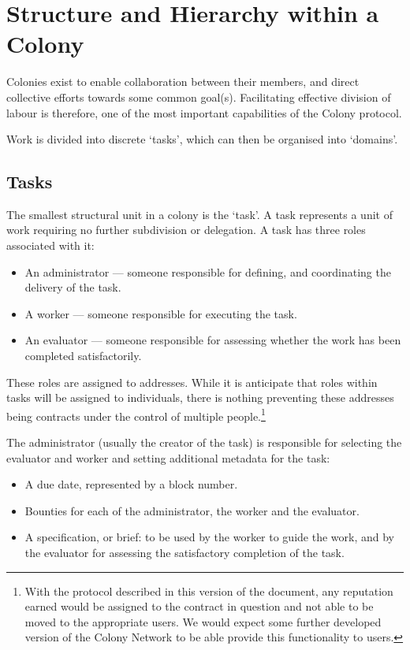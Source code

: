 \section{Structure and Hierarchy within a Colony}\label{sec:colony-structure}
Colonies exist to enable collaboration between their members, and direct collective efforts towards some common goal(s). Facilitating effective division of labour is therefore, one of the most important capabilities of the Colony protocol.

Work is divided into discrete `tasks', which can then be organised into `domains'.

\subsection{Tasks}\label{sec:tasks}

The smallest structural unit in a colony is the `task'. A task represents a unit of work requiring no further subdivision or delegation. A task has three roles associated with it:
\begin{itemize}
\item An administrator --- someone responsible for defining, and coordinating the delivery of the task.
\item A worker --- someone responsible for executing the task.
\item An evaluator --- someone responsible for assessing whether the work has been completed satisfactorily.
\end{itemize}

These roles are assigned to addresses. While it is anticipate that roles within tasks will be assigned to individuals, there is nothing preventing these addresses being contracts under the control of multiple people.\footnote{With the protocol described in this version of the document, any reputation earned would be assigned to the contract in question and not able to be moved to the appropriate users. We would expect some further developed version of the Colony Network to be able provide this functionality to users.}

The administrator (usually the creator of the task) is responsible for selecting the evaluator and worker and setting additional metadata for the task:

\begin{itemize}
\item A due date, represented by a block number.
\item Bounties for each of the administrator, the worker and the evaluator.
\item A specification, or brief: to be used by the worker to guide the work, and by the evaluator for assessing the satisfactory completion of the task.
\end{itemize}

